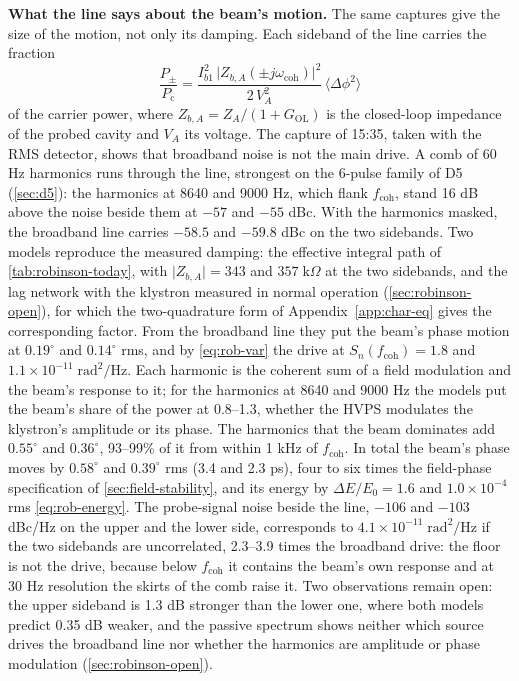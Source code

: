 \textbf{What the line says about the beam's motion.} The same captures give the size of the motion, not only its damping. Each sideband of the line carries the fraction
\begin{equation}\label{eq:rob-line-area}
\frac{P_\pm}{P_\text{c}} = \frac{I_{b1}^2\,\lvert Z_{b,A}(\pm j\omega_\text{coh})\rvert^2}{2\,V_A^2}\,\langle\Delta\phi^2\rangle
\end{equation}
of the carrier power, where \(Z_{b,A} = Z_A/(1 + G_\text{OL})\) is the closed-loop impedance of the probed cavity and \(V_A\) its voltage. The capture of 15:35, taken with the RMS detector, shows that broadband noise is not the main drive. A comb of 60 Hz harmonics runs through the line, strongest on the 6-pulse family of D5 (\cref{sec:d5}): the harmonics at 8640 and 9000 Hz, which flank \(f_\text{coh}\), stand 16 dB above the noise beside them at \(-57\) and \(-55\) dBc. With the harmonics masked, the broadband line carries \(-58.5\) and \(-59.8\) dBc on the two sidebands. Two models reproduce the measured damping: the effective integral path of \cref{tab:robinson-today}, with \(\lvert Z_{b,A}\rvert = 343\) and \(357\;\text{k}\Omega\) at the two sidebands, and the lag network with the klystron measured in normal operation (\cref{sec:robinson-open}), for which the two-quadrature form of Appendix~\ref{app:char-eq} gives the corresponding factor. From the broadband line they put the beam's phase motion at \(0.19^\circ\) and \(0.14^\circ\) rms, and by \cref{eq:rob-var} the drive at \(S_n(f_\text{coh}) = 1.8\) and \(1.1\times10^{-11}\;\text{rad}^2/\text{Hz}\). Each harmonic is the coherent sum of a field modulation and the beam's response to it; for the harmonics at 8640 and 9000 Hz the models put the beam's share of the power at 0.8--1.3, whether the HVPS modulates the klystron's amplitude or its phase. The harmonics that the beam dominates add \(0.55^\circ\) and \(0.36^\circ\), 93--99\% of it from within 1 kHz of \(f_\text{coh}\). In total the beam's phase moves by \(0.58^\circ\) and \(0.39^\circ\) rms (3.4 and 2.3 ps), four to six times the field-phase specification of \cref{sec:field-stability}, and its energy by \(\Delta E/E_0 = 1.6\) and \(1.0\times10^{-4}\) rms \eqref{eq:rob-energy}. The probe-signal noise beside the line, \(-106\) and \(-103\) dBc/Hz on the upper and the lower side, corresponds to \(4.1\times10^{-11}\;\text{rad}^2/\text{Hz}\) if the two sidebands are uncorrelated, 2.3--3.9 times the broadband drive: the floor is not the drive, because below \(f_\text{coh}\) it contains the beam's own response and at 30 Hz resolution the skirts of the comb raise it. Two observations remain open: the upper sideband is 1.3 dB stronger than the lower one, where both models predict 0.35 dB weaker, and the passive spectrum shows neither which source drives the broadband line nor whether the harmonics are amplitude or phase modulation (\cref{sec:robinson-open}).


